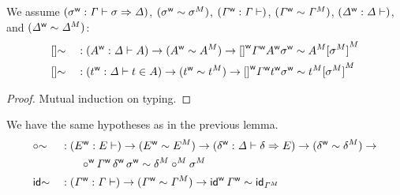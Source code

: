 \begin{lemma}
We assume
  $({\sigma}^{\mathsf{w}} : \mathit{\Gamma} \vdash \sigma \Rightarrow \mathit{\Delta})$,
  $({\sigma}^{\mathsf{w}} \sim {\sigma}^M)$,
  $({\mathit{\Gamma}}^{\mathsf{w}} : \mathit{\Gamma} \vdash )$,
  $({\mathit{\Gamma}}^{\mathsf{w}} \sim {\mathit{\Gamma}}^M)$,
    $({\mathit{\Delta}}^{\mathsf{w}} : \mathit{\Delta} \vdash )$,
    and
  $({\mathit{\Delta}}^{\mathsf{w}} \sim {\mathit{\Delta}}^M)$:
\begin{alignat*}{5}
     & []{\sim} && :
    ({A}^{\mathsf{w}} : \mathit{\Delta} \vdash A) \rightarrow
  ({A}^{\mathsf{w}} \sim {A}^M) \rightarrow
   {[]}^{\mathsf{w}}{\mathit{\Gamma}}^{\mathsf{w}}{A}^{\mathsf{w}}{\sigma}^{\mathsf{w}} \sim {A}^M{[{\sigma}^M]}^M
   \\
     & []{\sim} && :
    ({t}^{\mathsf{w}} : \mathit{\Delta} \vdash t \in A ) \rightarrow
  ({t}^{\mathsf{w}} \sim {t}^M) \rightarrow
   {[]}^{\mathsf{w}}{\mathit{\Gamma}}^{\mathsf{w}}{t}^{\mathsf{w}}{\sigma}^{\mathsf{w}} \sim {t}^M{[{\sigma}^M]}^M
 \end{alignat*}
\end{lemma}
\begin{proof}
  Mutual induction on typing.
\end{proof}
\begin{lemma}
  We have the same hypotheses as in the previous lemma.
  \begin{alignat*}{5}
     & {\circ}{\sim} && :
    ({E}^{\mathsf{w}} : E \vdash ) \rightarrow
  ({E}^{\mathsf{w}} \sim {E}^M) \rightarrow
    ({\delta}^{\mathsf{w}} : \mathit{\Delta} \vdash \delta \Rightarrow E) \rightarrow
  ({\delta}^{\mathsf{w}} \sim {\delta}^M) \rightarrow
  \\
  & && \qquad
   {{\circ}}^{\mathsf{w}}\,{\mathit{\Gamma}}^{\mathsf{w}}\,{\delta}^{\mathsf{w}}\,{\sigma}^{\mathsf{w}} \sim {\delta}^M\mathbin{{\circ}^M}{\sigma}^M \\
     & {\mathsf{id}}{\sim} && :
    ({\mathit{\Gamma}}^{\mathsf{w}} : \mathit{\Gamma} \vdash ) \rightarrow
  ({\mathit{\Gamma}}^{\mathsf{w}} \sim {\mathit{\Gamma}}^M) \rightarrow
   {{\mathsf{id}}}^{\mathsf{w}}\,{\mathit{\Gamma}}^{\mathsf{w}} \sim {\mathsf{id}}_{{\mathit{\Gamma}}^M}
 \end{alignat*}
 \end{lemma}

